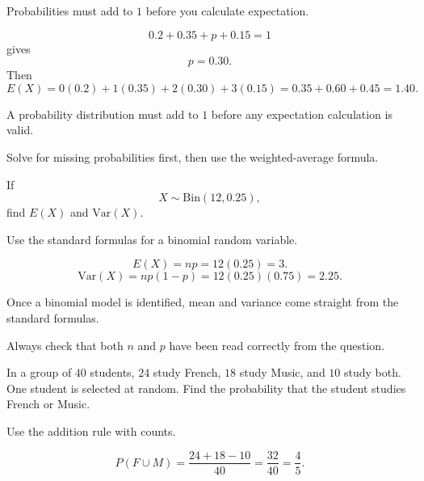 \begin{hint}
Probabilities must add to $1$ before you calculate expectation.
\end{hint}

\begin{solution}
\[
0.2+0.35+p+0.15=1
\]
gives
\[
p=0.30.
\]
Then
\[
E(X)=0(0.2)+1(0.35)+2(0.30)+3(0.15)=0.35+0.60+0.45=1.40.
\]
\end{solution}

\begin{takeaways}
\item A probability distribution must add to $1$ before any expectation calculation is valid.
\item Solve for missing probabilities first, then use the weighted-average formula.
\end{takeaways}

\begin{problem}
If
\[
X\sim \mathrm{Bin}(12,0.25),
\]
find $E(X)$ and $\mathrm{Var}(X)$.
\end{problem}

\begin{hint}
Use the standard formulas for a binomial random variable.
\end{hint}

\begin{solution}
\[
E(X)=np=12(0.25)=3.
\]
\[
\mathrm{Var}(X)=np(1-p)=12(0.25)(0.75)=2.25.
\]
\end{solution}

\begin{takeaways}
\item Once a binomial model is identified, mean and variance come straight from the standard formulas.
\item Always check that both $n$ and $p$ have been read correctly from the question.
\end{takeaways}

\begin{problem}
In a group of $40$ students, $24$ study French, $18$ study Music, and $10$ study both. One student is selected at random. Find the probability that the student studies French or Music.
\end{problem}

\begin{hint}
Use the addition rule with counts.
\end{hint}

\begin{solution}
\[
P(F\cup M)=\frac{24+18-10}{40}=\frac{32}{40}=\frac45.
\]
\end{solution}

